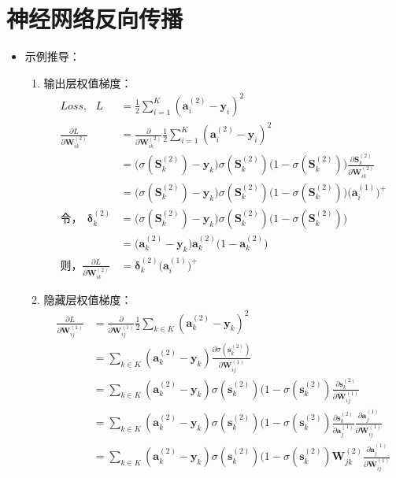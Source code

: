 \documentclass[UTF-8]{progbookcn}
\begin{document}
\section{神经网络反向传播\cite{BP}}
\begin{itemize}
  \item 示例推导：
    \begin{enumerate}[(1)]
    \item 输出层权值梯度：
  \begin{align*}
    Loss,~~~L&=\frac{1}{2}\sum_{i=1}^{K}(\bm{a}^{(2)}_i-\bm{y}_i)^2\\
    \frac{\partial L}{\partial \bm{W}^{(2)}_{ik}}&=\frac{\partial}{\partial \bm{W}^{(2)}_{ik}}\frac{1}{2}\sum_{i=1}^{K}(\bm{a}^{(2)}_i-\bm{y}_i)^2\\
    &=\big(\sigma(\bm{S}^{(2)}_k)-\bm{y}_k\big)\sigma(\bm{S}^{(2)}_k)\big(1-\sigma(\bm{S}^{(2)}_k)\big)\frac{\partial \bm{S}^{(2)}_k}{\partial \bm{W}^{(2)}_{ik}}\\
    &=\big(\sigma(\bm{S}^{(2)}_k)-\bm{y}_k\big)\sigma(\bm{S}^{(2)}_k)\big(1-\sigma(\bm{S}^{(2)}_k)\big)\big(\bm{a}^{(1)}_i\big)^+\\
    \text{令，}~~\bm{\delta}^{(2)}_k&=\big(\sigma(\bm{S}^{(2)}_k)-\bm{y}_k\big)\sigma(\bm{S}^{(2)}_k)\big(1-\sigma(\bm{S}^{(2)}_k)\big)\\
    &=\big(\bm{a}^{(2)}_k-\bm{y}_k\big)\bm{a}^{(2)}_k\big(1-\bm{a}^{(2)}_k\big)\\
    \text{则，}\frac{\partial L}{\partial \bm{W}^{(2)}_{ik}}&=\bm{\delta}^{(2)}_k\big(\bm{a}^{(1)}_i\big)^+
  \end{align*}
    \item 隐藏层权值梯度：
\begin{align*}
       \frac{\partial L}{\partial \bm{W}^{(1)}_{ij}}&=\frac{\partial}{\partial \bm{W}^{(1)}_{ij}}\frac{1}{2}\sum_{k\in K}(\bm{a}^{(2)}_k-\bm{y}_k)^2\\
       &=\sum_{k\in K}(\bm{a}^{(2)}_k-\bm{y}_k)\frac{\partial \sigma(\bm{s}^{(2)}_k)}{\partial  \bm{W}^{(1)}_{ij}}\\
       &=\sum_{k\in K}(\bm{a}^{(2)}_k-\bm{y}_k)\sigma(\bm{s}^{(2)}_k)\big(1-\sigma(\bm{s}^{(2)}_k)\frac{\partial \bm{s}^{(2)}_k}{\partial  \bm{W}^{(1)}_{ij}}\\
       &=\sum_{k\in K}(\bm{a}^{(2)}_k-\bm{y}_k)\sigma(\bm{s}^{(2)}_k)\big(1-\sigma(\bm{s}^{(2)}_k)\frac{\partial \bm{s}^{(2)}_k}{\partial  \bm{a}^{(1)}_{j}}\frac{\partial \bm{a}^{(1)}_{j}}{\partial  \bm{W}^{(1)}_{ij}}\\
       &=\sum_{k\in K}(\bm{a}^{(2)}_k-\bm{y}_k)\sigma(\bm{s}^{(2)}_k)\big(1-\sigma(\bm{s}^{(2)}_k)\bm{W}^{(2)}_{jk}\frac{\partial \bm{a}^{(1)}_{j}}{\partial  \bm{W}^{(1)}_{ij}}\\

\end{align*}
\end{enumerate}
\end{itemize}
\end{document}
